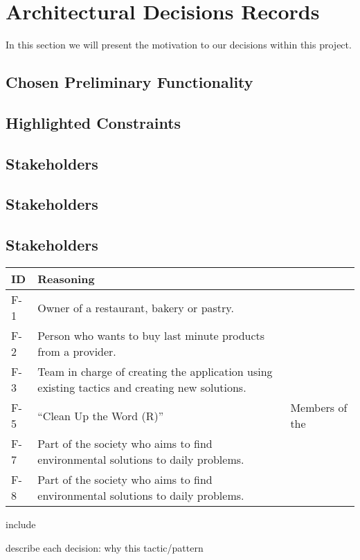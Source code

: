 \section{Architectural Decisions Records}

In this section we will present the motivation to our decisions within this project.

\subsection{Chosen Preliminary Functionality}

\subsection{Highlighted Constraints}

\subsection{Stakeholders}

\subsection{Stakeholders}

\subsection{Stakeholders}

\begin{table}[H]
    \begin{tabularx}{\textwidth}{lX}
    \toprule
    ID & Reasoning   \\
    \midrule
    F-1 & Owner of a restaurant, bakery or pastry. \\
    F-2 & Person who wants to buy last minute products from a provider. \\
    F-3 & Team in charge of creating the application using existing tactics and creating new solutions. \\
    F-5 & ``Clean Up the Word (R)'' & Members of the  \\
    F-7 & Part of the society who aims to find environmental solutions to daily problems. \\
    F-8 & Part of the society who aims to find environmental solutions to daily problems. \\
    \bottomrule
    \end{tabularx}
\end{table}

include

describe each decision:
why this tactic/pattern